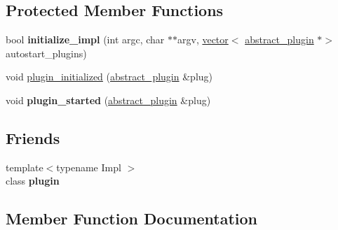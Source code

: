 \subsection*{Protected Member Functions}
\begin{DoxyCompactItemize}
\item 
\mbox{\label{classappbase_1_1application_ab4a686729750000cd3611770fe107e11}} 
bool {\bfseries initialize\+\_\+impl} (int argc, char $\ast$$\ast$argv, \mbox{\hyperlink{classstd_1_1vector}{vector}}$<$ \mbox{\hyperlink{classappbase_1_1abstract__plugin}{abstract\+\_\+plugin}} $\ast$$>$ autostart\+\_\+plugins)
\end{DoxyCompactItemize}
\textbf{ }\par
\begin{DoxyCompactItemize}
\item 
void \mbox{\hyperlink{classappbase_1_1application_a110137cd2c59d1d998750eeb28443b5d}{plugin\+\_\+initialized}} (\mbox{\hyperlink{classappbase_1_1abstract__plugin}{abstract\+\_\+plugin}} \&plug)
\item 
\mbox{\label{classappbase_1_1application_ad5635d30c2f520340d58665ed99f8a4d}} 
void {\bfseries plugin\+\_\+started} (\mbox{\hyperlink{classappbase_1_1abstract__plugin}{abstract\+\_\+plugin}} \&plug)
\end{DoxyCompactItemize}

\subsection*{Friends}
\begin{DoxyCompactItemize}
\item 
\mbox{\label{classappbase_1_1application_ad76f20d019c93aec51c49c7b9c8cda18}} 
{\footnotesize template$<$typename Impl $>$ }\\class {\bfseries plugin}
\end{DoxyCompactItemize}


\subsection{Member Function Documentation}
\mbox{\label{classappbase_1_1application_a9b2c99749c7209e218a3dbbe51cfdeac}} 
